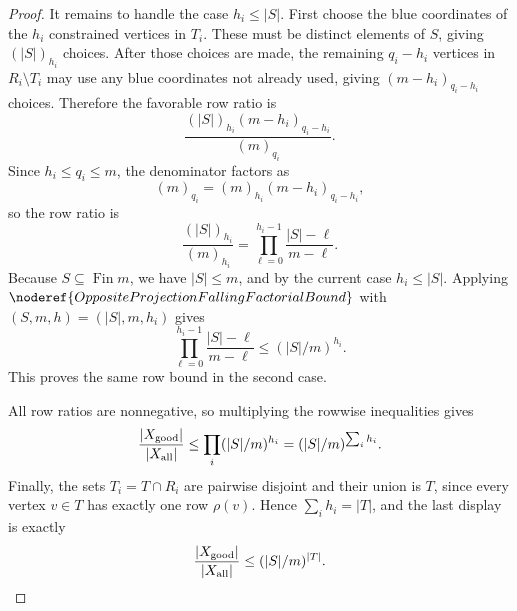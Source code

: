 \begin{proof}
It remains to handle the case \(h_i\le |S|\).  First choose the blue
coordinates of the \(h_i\) constrained vertices in \(T_i\).  These must be
distinct elements of \(S\), giving \((|S|)_{h_i}\) choices.  After those
choices are made, the remaining \(q_i-h_i\) vertices in \(R_i\setminus T_i\)
may use any blue coordinates not already used, giving
\((m-h_i)_{q_i-h_i}\) choices.  Therefore the favorable row ratio is
\[
\frac{(|S|)_{h_i}(m-h_i)_{q_i-h_i}}{(m)_{q_i}}.
\]
Since \(h_i\le q_i\le m\), the denominator factors as
\[
(m)_{q_i}=(m)_{h_i}(m-h_i)_{q_i-h_i},
\]
so the row ratio is
\[
\frac{(|S|)_{h_i}}{(m)_{h_i}}
=\prod_{\ell=0}^{h_i-1}\frac{|S|-\ell}{m-\ell}.
\]
Because \(S\subseteq\operatorname{Fin}m\), we have \(|S|\le m\), and by the
current case \(h_i\le |S|\).  Applying
\(\noderef{OppositeProjectionFallingFactorialBound}\) with
\((S,m,h)=(|S|,m,h_i)\) gives
\[
\prod_{\ell=0}^{h_i-1}\frac{|S|-\ell}{m-\ell}
\le (|S|/m)^{h_i}.
\]
This proves the same row bound in the second case.

All row ratios are nonnegative, so multiplying the rowwise inequalities gives
\[
\frac{|X_{\rm good}|}{|X_{\rm all}|}
\le \prod_i (|S|/m)^{h_i}
=(|S|/m)^{\sum_i h_i}.
\]
Finally, the sets \(T_i=T\cap R_i\) are pairwise disjoint and their union is
\(T\), since every vertex \(v\in T\) has exactly one row \(\rho(v)\).  Hence
\(\sum_i h_i=|T|\), and the last display is exactly
\[
\frac{|X_{\rm good}|}{|X_{\rm all}|}
\le (|S|/m)^{|T|}.
\]
\end{proof}

